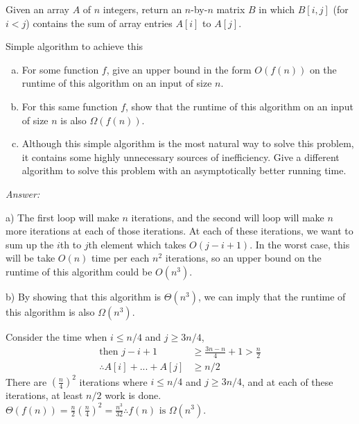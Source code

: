 \documentclass[12pt]{article}
\newenvironment{problem}[2][Problem]{\begin{trivlist}
\item[\hskip \labelsep {\bfseries #1}\hskip \labelsep {\bfseries #2.}]}{\end{trivlist}}
\begin{document}
\begin{problem}{4}
Given an array $A$ of $n$ integers, return an $n$-by-$n$ matrix $B$ in which $B[i,j]$ (for $i<j$) contains the sum of array entries $A[i]$ to $A[j]$.

\begin{algorithm}
\caption{Simple algorithm to achieve this}
\begin{algorithmic}
	\EndFor
\EndFor
\end{algorithmic}
\end{algorithm}
\begin{enumerate}[a)]
	\item For some function $f$, give an upper bound in the form $O(f(n))$ on the runtime of this algorithm on an input of size $n$.
	\item For this same function $f$, show that the runtime of this algorithm on an input of size $n$ is also $\Omega(f(n))$.
	\item Although this simple algorithm is the most natural way to solve this problem, it contains some highly unnecessary sources of inefficiency. Give a different algorithm to solve this problem with an asymptotically better running time.
\end{enumerate}
\end{problem}

\textit{Answer: } 

a) The first loop will make $n$ iterations, and the second will loop will make $n$ more iterations at each of those iterations. At each of these iterations, we want to sum up the $i$th to $j$th element which takes $O(j-i+1)$. In the worst case, this will be take $O(n)$ time per each $n^2$ iterations, so an upper bound on the runtime of this algorithm could be $O(n^3)$.

b) By showing that this algorithm is $\Theta(n^3)$, we can imply that the runtime of this algorithm is also $\Omega(n^3)$. 

Consider the time when $i\leq n/4$ and $j \geq 3n/4$, 
\begin{align*}
\text{then } j-i+1 &\geq \frac{3n-n}{4}+1 > \frac{n}{2}\\
\therefore A[i] + ...  + A[j] &\geq n/2
\end{align*}
There are $(\frac{n}{4})^2$ iterations where $i\leq n/4$ and $j \geq 3n/4$, and at each of these iterations, at least $n/2$ work is done. $\Theta(f(n))=\frac{n}{2}(\frac{n}{4})^2= \frac{n^3}{32} \therefore f(n) \text{ is } \Omega(n^3).$
\end{document}
